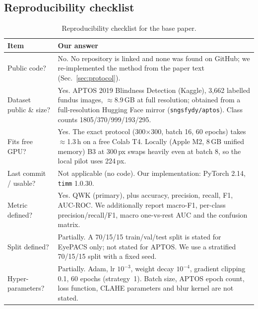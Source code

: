 \subsection{Reproducibility checklist}
\begin{table}[h]
\centering
\caption{Reproducibility checklist for the base paper.}
\label{tab:checklist}
\footnotesize
\begin{tabular}{p{}p{}}
\toprule
Item & Our answer \\
\midrule
Public code? & No. No repository is linked and none was found on GitHub; we re-implemented the method from the
paper text (Sec.~\ref{sec:protocol}). \\
Dataset public \& size? & Yes. APTOS 2019 Blindness Detection (Kaggle), 3{,}662 labelled fundus images,
$\approx$8.9\,GB at full resolution; obtained from a full-resolution Hugging Face mirror
(\texttt{sngsfydy/aptos}). Class counts 1805/370/999/193/295. \\
Fits free GPU? & Yes. The exact protocol (300$\times$300, batch 16, 60 epochs) takes $\approx$1.3\,h on a
free Colab T4. Locally (Apple M2, 8\,GB unified memory) B3 at 300\,px swaps heavily even at batch 8, so the
local pilot uses 224\,px. \\
Last commit / usable? & Not applicable (no code). Our implementation: PyTorch 2.14, \texttt{timm} 1.0.30. \\
Metric defined? & Yes. QWK (primary), plus accuracy, precision, recall, F1, AUC-ROC. We additionally report
macro-F1, per-class precision/recall/F1, macro one-vs-rest AUC and the confusion matrix. \\
Split defined? & Partially. A 70/15/15 train/val/test split is stated for EyePACS only; not stated for APTOS.
We use a stratified 70/15/15 split with a fixed seed. \\
Hyper-parameters? & Partially. Adam, lr $10^{-3}$, weight decay $10^{-4}$, gradient clipping 0.1, 60 epochs
(strategy~1). Batch size, APTOS epoch count, loss function, CLAHE parameters and blur kernel are not stated. \\
\bottomrule
\end{tabular}
\end{table}

